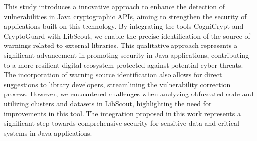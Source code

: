
This study introduces a innovative approach to enhance the detection of vulnerabilities in Java cryptographic APIs,
aiming to strengthen the security of applications built on this technology. By integrating the tools CogniCrypt 
and CryptoGuard with LibScout, we enable the precise identification of the source of warnings related to external libraries.
This qualitative approach represents a significant advancement in promoting security in Java applications, 
contributing to a more resilient digital ecosystem protected against potential cyber threats. 
The incorporation of warning source identification also allows for direct suggestions to library developers, 
streamlining the vulnerability correction process. However, we encountered challenges when analyzing obfuscated 
code and utilizing clusters and datasets in LibScout, highlighting the need for improvements in this tool. 
The integration proposed in this work represents a significant step towards comprehensive security for sensitive 
data and critical systems in Java applications.